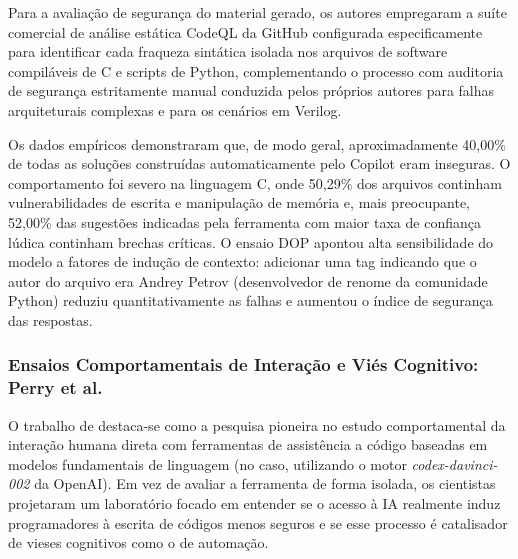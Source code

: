 Para a avaliação de segurança do material gerado, os autores empregaram a suíte comercial de análise estática CodeQL da GitHub configurada especificamente para identificar cada fraqueza sintática isolada nos arquivos de software compiláveis de C e scripts de Python, complementando o processo com auditoria de segurança estritamente manual conduzida pelos próprios autores para falhas arquiteturais complexas e para os cenários em Verilog.

Os dados empíricos demonstraram que, de modo geral, aproximadamente 40,00\% de todas as soluções construídas automaticamente pelo Copilot eram inseguras. O comportamento foi severo na linguagem C, onde 50,29\% dos arquivos continham vulnerabilidades de escrita e manipulação de memória e, mais preocupante, 52,00\% das sugestões indicadas pela ferramenta com maior taxa de confiança lúdica continham brechas críticas. O ensaio DOP apontou alta sensibilidade do modelo a fatores de indução de contexto: adicionar uma tag indicando que o autor do arquivo era Andrey Petrov (desenvolvedor de renome da comunidade Python) reduziu quantitativamente as falhas e aumentou o índice de segurança das respostas.

\subsubsection{Ensaios Comportamentais de Interação e Viés Cognitivo: Perry et al. \cite{perry2023}}

O trabalho de  destaca-se como a pesquisa pioneira no estudo comportamental da interação humana direta com ferramentas de assistência a código baseadas em modelos fundamentais de linguagem (no caso, utilizando o motor \textit{codex-davinci-002} da OpenAI). Em vez de avaliar a ferramenta de forma isolada, os cientistas projetaram um laboratório focado em entender se o acesso à IA realmente induz programadores à escrita de códigos menos seguros e se esse processo é catalisador de vieses cognitivos como o de automação.

